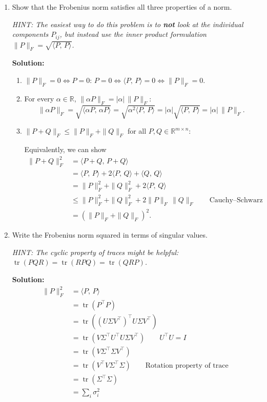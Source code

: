 \documentclass[10pt]{article}
\theoremstyle{definition}
\theoremstyle{plain}
\newcommand{\RR}{\mathbb{R}}
\DeclareMathOperator{\trace}{tr}
\begin{document}
\begin{enumerate}[label=(\alph*)]
\item Show that the Frobenius norm satisfies all three properties of a norm.

\textit{HINT: The easiest way to do this problem is to \textbf{not} look at the individual components $P_{ij}$, but instead use the inner product formulation $\|P\|_F = \sqrt{\langle P,\, P \rangle}$.}

\textbf{Solution:}
\begin{enumerate}[label=\roman*.]
\item $\|P\|_F = 0 \iff P = 0$: $P = 0 \iff \langle P,\, P \rangle = 0 \iff \|P\|_F = 0$.

\item For every $\alpha \in \RR$, $\|\alpha P\|_F = |\alpha| \, \|P\|_F$:
\[
\|\alpha P\|_F = \sqrt{\langle \alpha P,\, \alpha P \rangle} = \sqrt{\alpha^2 \langle P,\, P \rangle} = |\alpha| \sqrt{\langle P,\, P \rangle} = |\alpha| \, \|P\|_F.
\]

\item $\|P + Q\|_F \le \|P\|_F + \|Q\|_F$ for all $P, Q \in \RR^{m \times n}$:

Equivalently, we can show
\begin{align}
\|P + Q\|_F^2 &= \langle P + Q,\, P + Q \rangle \\
&= \langle P,\, P \rangle + 2\langle P,\, Q \rangle + \langle Q,\, Q \rangle \\
&= \|P\|_F^2 + \|Q\|_F^2 + 2\langle P,\, Q \rangle \\
&\le \|P\|_F^2 + \|Q\|_F^2 + 2\|P\|_F \, \|Q\|_F \qquad \text{Cauchy--Schwarz} \\
&= (\|P\|_F + \|Q\|_F)^2.
\end{align}
\end{enumerate}

\item Write the Frobenius norm squared in terms of singular values.

\textit{HINT: The cyclic property of traces might be helpful: $\trace(PQR) = \trace(RPQ) = \trace(QRP)$.}

\textbf{Solution:}
\begin{align}
\|P\|_F^2 &= \langle P,\, P \rangle \\
&= \trace\!\left(P^\top P\right) \\
&= \trace\!\left((U\Sigma V^\top)^\top U\Sigma V^\top\right) \\
&= \trace\!\left(V\Sigma^\top U^\top U\Sigma V^\top\right) \qquad U^\top U = I \\
&= \trace\!\left(V\Sigma^\top \Sigma V^\top\right) \\
&= \trace\!\left(V^\top V\Sigma^\top \Sigma\right) \qquad \text{Rotation property of trace} \\
&= \trace\!\left(\Sigma^\top \Sigma\right) \\
&= \sum_i \sigma_i^2
\end{align}


\end{enumerate}
\end{document}
